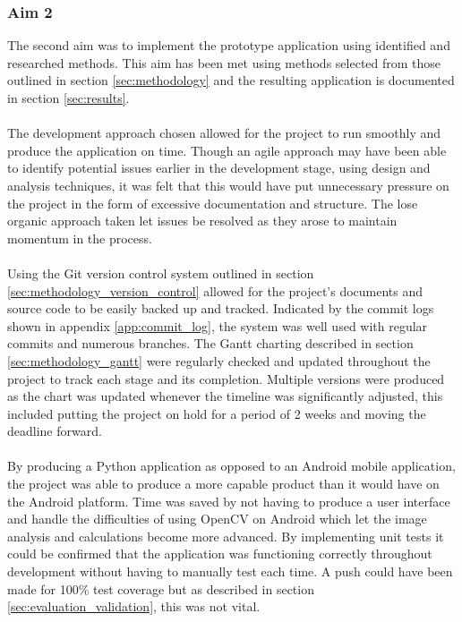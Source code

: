 		\subsubsection{Aim 2}
			The second aim was to implement the prototype application using identified and researched methods. This aim has been met using methods selected from those outlined in section \ref{sec:methodology} and the resulting application is documented in section \ref{sec:results}.
			\\\\
			The development approach chosen allowed for the project to run smoothly and produce the application on time. Though an agile approach may have been able to identify potential issues earlier in the development stage, using design and analysis techniques, it was felt that this would have put unnecessary pressure on the project in the form of excessive documentation and structure. The lose organic approach taken let issues be resolved as they arose to maintain momentum in the process.
			\\\\
			Using the Git version control system outlined in section \ref{sec:methodology_version_control} allowed for the project's documents and source code to be easily backed up and tracked. Indicated by the commit logs shown in appendix \ref{app:commit_log}, the system was well used with regular commits and numerous branches. The Gantt charting described in section \ref{sec:methodology_gantt} were regularly checked and updated throughout the project to track each stage and its completion. Multiple versions were produced as the chart was updated whenever the timeline was significantly adjusted, this included putting the project on hold for a period of 2 weeks and moving the deadline forward.
			\\\\
			By producing a Python application as opposed to an Android mobile application, the project was able to produce a more capable product than it would have on the Android platform. Time was saved by not having to produce a user interface and handle the difficulties of using OpenCV on Android which let the image analysis and calculations become more advanced. By implementing unit tests it could be confirmed that the application was functioning correctly throughout development without having to manually test each time. A push could have been made for 100\% test coverage but as described in section \ref{sec:evaluation_validation}, this was not vital.
